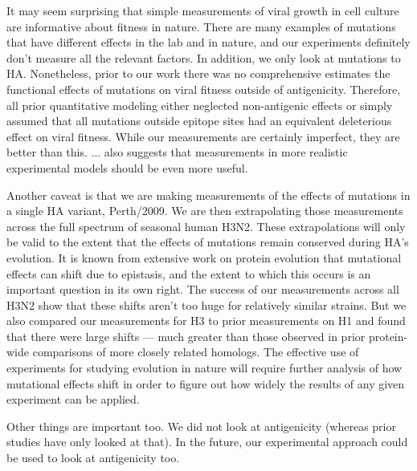 \documentclass[9pt,twocolumn,twoside]{pnas-new}
\begin{document}
It may seem surprising that simple measurements of viral growth in cell culture are informative about fitness in nature.
There are many examples of mutations that have different effects in the lab and in nature, and our experiments definitely don't measure all the relevant factors.
In addition, we only look at mutations to HA.
Nonetheless, prior to our work there was no comprehensive estimates the functional effects of mutations on viral fitness outside of antigenicity.
Therefore, all prior quantitative modeling either neglected non-antigenic effects or simply assumed that all mutations outside epitope sites had an equivalent deleterious effect on viral fitness.
While our measurements are certainly imperfect, they are better than this.
... also suggests that measurements in more realistic experimental models should be even more useful.

Another caveat is that we are making measurements of the effects of mutations in a single HA variant, Perth/2009.
We are then extrapolating those measurements across the full spectrum of seasonal human H3N2.
These extrapolations will only be valid to the extent that the effects of mutations remain conserved during HA's evolution.
It is known from extensive work on protein evolution that mutational effects can shift due to epistasis, and the extent to which this occurs is an important question in its own right.
The success of our measurements across all H3N2 show that these shifts aren't too huge for relatively similar strains.
But we also compared our measurements for H3 to prior measurements on H1 and found that there were large shifts --- much greater than those observed in prior protein-wide comparisons of more closely related homologs.
The effective use of experiments for studying evolution in nature will require further analysis of how mutational effects shift in order to figure out how widely the results of any given experiment can be applied.

Other things are important too.
We did not look at antigenicity (whereas prior studies have only looked at that).
In the future, our experimental approach could be used to look at antigenicity too.
\end{document}
